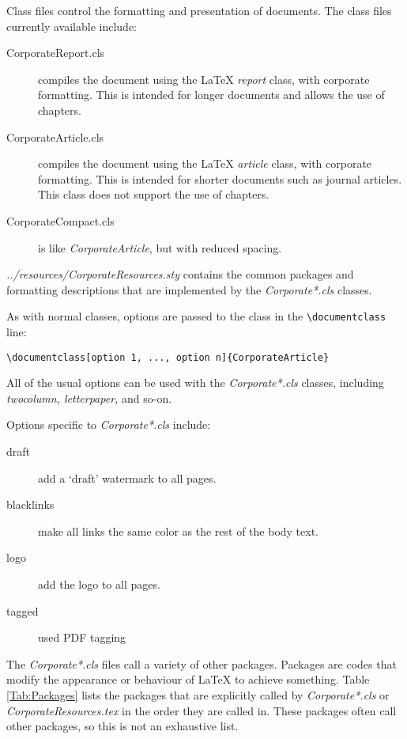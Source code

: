 Class files control the formatting and presentation of documents. The class files currently available include:
\begin{description}
\item[CorporateReport.cls]{compiles the document using the LaTeX \emph{report} class, with corporate formatting. This is intended for longer documents and allows the use of chapters.}
\item[CorporateArticle.cls] compiles the document using the LaTeX \emph{article} class, with corporate formatting. This is intended for shorter documents such as journal articles. This class does not support the use of chapters.
\item[CorporateCompact.cls] is like \emph{CorporateArticle}, but with reduced spacing.
\end{description}

\emph{../resources/CorporateResources.sty} contains the common packages and formatting descriptions that are implemented by the \emph{Corporate*.cls} classes.

As with normal classes, options are passed to the class in the \verb+\documentclass+ line:

\begin{lstlisting}[language={[LaTeX]Tex}]
\documentclass[option 1, ..., option n]{CorporateArticle}
\end{lstlisting}

All of the usual options can be used with the \emph{Corporate*.cls} classes, including \emph{twocolumn, letterpaper,} and so-on.

Options specific to \emph{Corporate*.cls} include:
\begin{description}
\item[draft]{add a `draft' watermark to all pages.}
\item[blacklinks]{make all links the same color as the rest of the body text.}
\item[logo]{add the logo to all pages.}
\item[tagged]{used PDF tagging}
\end{description}

The \emph{Corporate*.cls} files call a variety of other packages. Packages are codes that modify the appearance or behaviour of LaTeX to achieve something. Table \ref{Tab:Packages} lists the packages that are explicitly called by \emph{Corporate*.cls} or \emph{CorporateResources.tex} in the order they are called in. These packages often call other packages, so this is not an exhaustive list.

